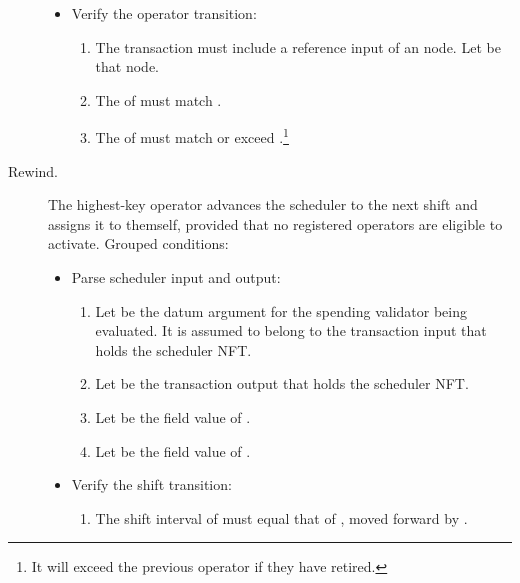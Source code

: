\documentclass[../midgard.tex]{subfiles}
\begin{document}
\begin{description}
\begin{itemize}
            \item Verify the operator transition:
            \begin{enumerate}[resume]
                \item The transaction must include a reference input of an  node.
                  Let  be that node.
                \item The  of  must match .
                \item The  of  must match or exceed .\footnote{It will exceed the previous operator if they have retired.}
            \end{enumerate}
        \end{itemize}

       \item[Rewind.] The highest-key operator advances the scheduler to the next shift and assigns it to themself, provided that no registered operators are eligible to activate.
         Grouped conditions:
        \begin{itemize}
            \item Parse scheduler input and output:
            \begin{enumerate}
                \item Let  be the datum argument for the spending validator being evaluated.
                  It is assumed to belong to the transaction input that holds the scheduler NFT.
                \item Let  be the transaction output that holds the scheduler NFT.
                \item Let  be the  field value of .
                \item Let  be the  field value of .
            \end{enumerate}
            \item Verify the shift transition:
            \begin{enumerate}[resume]
                \item The shift interval of  must equal that of , moved forward by .
            \end{enumerate}
            

\end{itemize}
\end{description}
\end{document}
